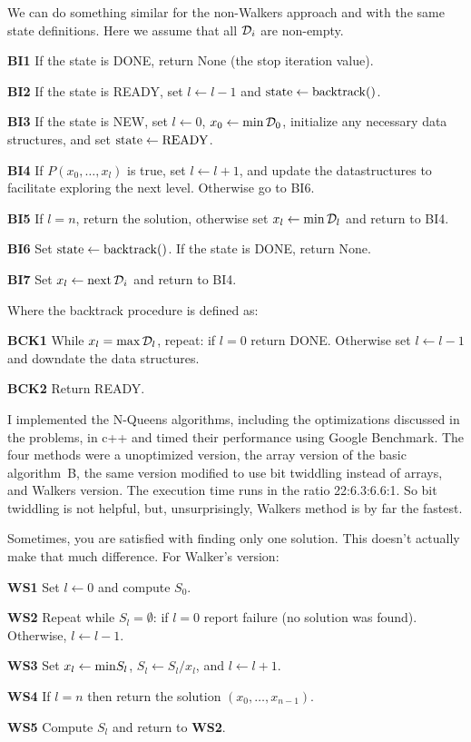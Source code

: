 We can do something similar for the non-Walkers approach  and with the same 
state definitions.  Here we assume that all ${\cal D}_i$ are non-empty.

\vskip 0.1in
\item{\bf BI1} If the state is DONE, return None (the stop iteration value).
\item{\bf BI2} If the state is READY, set $l \leftarrow l - 1$ and 
 ${\rm state} \leftarrow {\rm backtrack}()$.
\item{\bf BI3} If the state is NEW, set $l \leftarrow 0$, 
 $x_0 \leftarrow {\rm min}\,{\cal D}_0$, initialize any necessary data 
 structures, and set ${\rm state} \leftarrow {\rm READY}$.
\item{\bf BI4} If $P\left(x_0, \ldots, x_l\right)$ is true, set 
 $l \leftarrow l + 1$, and update the datastructures to facilitate exploring the
 next level.  Otherwise go to BI6.
\item{\bf BI5} If $l = n$, return the solution, otherwise set 
 $x_l \leftarrow {\rm min}\,{\cal D}_l$ and return to BI4.
\item{\bf BI6} Set ${\rm state} \leftarrow {\rm backtrack}()$.  If the state is
  DONE, return None.
\item{\bf BI7} Set $x_l \leftarrow {\rm next}\,{\cal D}_i$ and return to BI4.
\vskip 0.1in

\noindent Where the backtrack procedure is defined as:
\vskip 0.05in
\item {\bf BCK1} While $x_l = {\rm max}\,{\cal D}_l$, repeat: if $l = 0$
  return DONE.  Otherwise set $l \leftarrow l - 1$ and downdate the data
  structures.
\item {\bf BCK2} Return READY.
\vskip 0.1in

\noindent I implemented the N-Queens algorithms, including the optimizations
discussed in the problems, in c++ and timed their performance using
Google Benchmark.  The four methods were a  unoptimized
version, the array version of the basic algorithm~B, the
same version modified to use bit twiddling instead of arrays,
and Walkers version.  The execution time runs in the ratio
22:6.3:6.6:1.  So bit twiddling is not helpful, but, unsurprisingly,
Walkers method is by far the fastest.

Sometimes, you are satisfied with finding only one solution.  This doesn't
actually make that much difference.  For Walker's version:

\vskip 0.1in
\item{\bf WS1} Set $l \leftarrow 0$ and compute $S_0$.
\item{\bf WS2} Repeat while $S_l = \emptyset$: if $l = 0$ report failure
  (no solution was found).  Otherwise, $l \leftarrow l - 1$.
\item{\bf WS3} Set $x_l \leftarrow {\rm min} S_l$, 
 $S_l \leftarrow S_l / x_l$, and $l \leftarrow l + 1$.
\item{\bf WS4} If $l = n$ then return the solution 
  $\left(x_0, \ldots, x_{n-1}\right)$.
\item{\bf WS5} Compute $S_l$ and return to {\bf WS2}.
\vskip 0.1in

